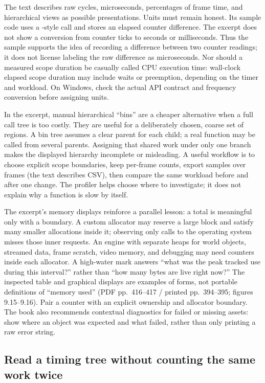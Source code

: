 The text describes raw cycles, microseconds, percentages of frame time, and hierarchical views as possible presentations. Units must remain honest. Its sample  code uses a -style call and stores an elapsed counter difference. The excerpt does not show a conversion from counter ticks to seconds or milliseconds. Thus the sample supports the idea of recording a difference between two counter readings; it does not license labeling the raw difference as microseconds. Nor should a measured scope duration be casually called CPU execution time: wall-clock elapsed scope duration may include waits or preemption, depending on the timer and workload. On Windows, check the actual API contract and frequency conversion before assigning units.

In the excerpt, manual hierarchical ``bins'' are a cheaper alternative when a full call tree is too costly. They are useful for a deliberately chosen, coarse set of regions. A bin tree assumes a clear parent for each child; a real function may be called from several parents. Assigning that shared work under only one branch makes the displayed hierarchy incomplete or misleading. A useful workflow is to choose explicit scope boundaries, keep per-frame counts, export samples over frames (the text describes CSV), then compare the same workload before and after one change. The profiler helps choose where to investigate; it does not explain why a function is slow by itself.

The excerpt's memory displays reinforce a parallel lesson: a total is meaningful only with a boundary. A custom allocator may reserve a large block and satisfy many smaller allocations inside it; observing only calls to the operating system misses those inner requests. An engine with separate heaps for world objects, streamed data, frame scratch, video memory, and debugging may need counters inside each allocator. A high-water mark answers ``what was the peak tracked use during this interval?'' rather than ``how many bytes are live right now?'' The inspected table and graphical displays are examples of forms, not portable definitions of ``memory used'' (PDF pp.~416--417 / printed pp.~394--395; figures 9.15--9.16). Pair a counter with an explicit ownership and allocator boundary. The book also recommends contextual diagnostics for failed or missing assets: show where an object was expected and what failed, rather than only printing a raw error string.

\subsection{Read a timing tree without counting the same work twice}\label{06-engine-ii-ch041-read-a-timing-tree-without-counting-the-same-work-twice}

